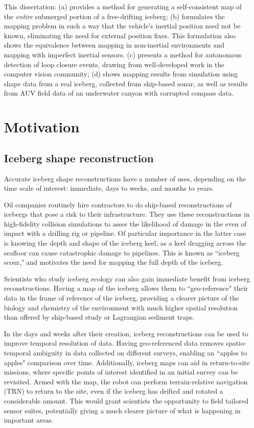 This dissertation: (a) provides a method for generating a self-consistent map of the \emph{entire} submerged portion of a free-drifting iceberg; (b) formulates the mapping problem in such a way that the vehicle's inertial position need not be known, eliminating the need for external position fixes. This formulation also shows the equivalence between mapping in non-inertial environments and mapping with imperfect inertial sensors. (c) presents a method for autonomous detection of loop closure events, drawing from well-developed work in the computer vision community; (d) shows mapping results from simulation using shape data from a real iceberg, collected from ship-based sonar, as well as results from AUV field data of an underwater canyon with corrupted compass data. 



\section{Motivation}

\subsection{Iceberg shape reconstruction}

Accurate iceberg shape reconstructions have a number of uses, depending on the time scale of interest: immediate, days to weeks, and months to years. 

Oil companies routinely hire contractors to do ship-based reconstructions of icebergs that pose a risk to their infrastructure. They use these reconstructions in high-fidelity collision simulations to asses the likelihood of damage in the even of impact with a drilling rig or pipeline. Of particular importance in the latter case is knowing the depth and shape of the iceberg keel, as a keel dragging across the seafloor can cause catastrophic damage to pipelines. This is known as ``iceberg scour," and motivates the need for mapping the full depth of the iceberg.

Scientists who study iceberg ecology can also gain immediate benefit from iceberg reconstructions. Having a map of the iceberg allows them to ``geo-reference" their data in the frame of reference of the iceberg, providing a clearer picture of the biology and chemistry of the environment with much higher spatial resolution than offered by ship-based study or Lagrangian sediment traps.

In the days and weeks after their creation, iceberg reconstructions can be used to improve temporal resolution of data. Having geo-referenced data removes spatio-temporal ambiguity in data collected on different surveys, enabling an ``apples to apples" comparison over time. Additionally, iceberg maps can aid in return-to-site missions, where specific points of interest identified in an initial survey can be revisited. Armed with the map, the robot can perform terrain-relative navigation (TRN) to return to the site, even if the iceberg has drifted and rotated a considerable amount. This would grant scientists the opportunity to field tailored sensor suites, potentially giving a much clearer picture of what is happening in important areas.

